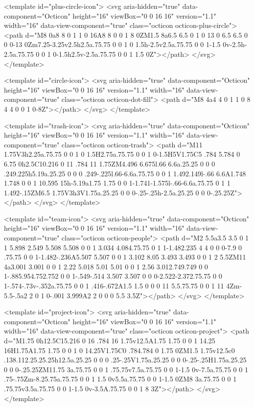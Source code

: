 <template id="plus-circle-icon">
  <svg aria-hidden="true" data-component="Octicon" height="16" viewBox="0 0 16 16" version="1.1" width="16" data-view-component="true" class="octicon octicon-plus-circle">
    <path d="M8 0a8 8 0 1 1 0 16A8 8 0 0 1 8 0ZM1.5 8a6.5 6.5 0 1 0 13 0 6.5 6.5 0 0 0-13 0Zm7.25-3.25v2.5h2.5a.75.75 0 0 1 0 1.5h-2.5v2.5a.75.75 0 0 1-1.5 0v-2.5h-2.5a.75.75 0 0 1 0-1.5h2.5v-2.5a.75.75 0 0 1 1.5 0Z"></path>
</svg>
</template>

<template id="circle-icon">
  <svg aria-hidden="true" data-component="Octicon" height="16" viewBox="0 0 16 16" version="1.1" width="16" data-view-component="true" class="octicon octicon-dot-fill">
    <path d="M8 4a4 4 0 1 1 0 8 4 4 0 0 1 0-8Z"></path>
</svg>
</template>

<template id="trash-icon">
  <svg aria-hidden="true" data-component="Octicon" height="16" viewBox="0 0 16 16" version="1.1" width="16" data-view-component="true" class="octicon octicon-trash">
    <path d="M11 1.75V3h2.25a.75.75 0 0 1 0 1.5H2.75a.75.75 0 0 1 0-1.5H5V1.75C5 .784 5.784 0 6.75 0h2.5C10.216 0 11 .784 11 1.75ZM4.496 6.675l.66 6.6a.25.25 0 0 0 .249.225h5.19a.25.25 0 0 0 .249-.225l.66-6.6a.75.75 0 0 1 1.492.149l-.66 6.6A1.748 1.748 0 0 1 10.595 15h-5.19a1.75 1.75 0 0 1-1.741-1.575l-.66-6.6a.75.75 0 1 1 1.492-.15ZM6.5 1.75V3h3V1.75a.25.25 0 0 0-.25-.25h-2.5a.25.25 0 0 0-.25.25Z"></path>
</svg>
</template>

<template id="team-icon">
  <svg aria-hidden="true" data-component="Octicon" height="16" viewBox="0 0 16 16" version="1.1" width="16" data-view-component="true" class="octicon octicon-people">
    <path d="M2 5.5a3.5 3.5 0 1 1 5.898 2.549 5.508 5.508 0 0 1 3.034 4.084.75.75 0 1 1-1.482.235 4 4 0 0 0-7.9 0 .75.75 0 0 1-1.482-.236A5.507 5.507 0 0 1 3.102 8.05 3.493 3.493 0 0 1 2 5.5ZM11 4a3.001 3.001 0 0 1 2.22 5.018 5.01 5.01 0 0 1 2.56 3.012.749.749 0 0 1-.885.954.752.752 0 0 1-.549-.514 3.507 3.507 0 0 0-2.522-2.372.75.75 0 0 1-.574-.73v-.352a.75.75 0 0 1 .416-.672A1.5 1.5 0 0 0 11 5.5.75.75 0 0 1 11 4Zm-5.5-.5a2 2 0 1 0-.001 3.999A2 2 0 0 0 5.5 3.5Z"></path>
</svg>
</template>

<template id="project-icon">
  <svg aria-hidden="true" data-component="Octicon" height="16" viewBox="0 0 16 16" version="1.1" width="16" data-view-component="true" class="octicon octicon-project">
    <path d="M1.75 0h12.5C15.216 0 16 .784 16 1.75v12.5A1.75 1.75 0 0 1 14.25 16H1.75A1.75 1.75 0 0 1 0 14.25V1.75C0 .784.784 0 1.75 0ZM1.5 1.75v12.5c0 .138.112.25.25.25h12.5a.25.25 0 0 0 .25-.25V1.75a.25.25 0 0 0-.25-.25H1.75a.25.25 0 0 0-.25.25ZM11.75 3a.75.75 0 0 1 .75.75v7.5a.75.75 0 0 1-1.5 0v-7.5a.75.75 0 0 1 .75-.75Zm-8.25.75a.75.75 0 0 1 1.5 0v5.5a.75.75 0 0 1-1.5 0ZM8 3a.75.75 0 0 1 .75.75v3.5a.75.75 0 0 1-1.5 0v-3.5A.75.75 0 0 1 8 3Z"></path>
</svg>
</template>

